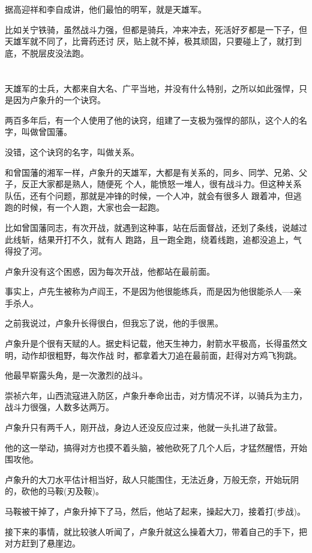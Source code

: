 \documentclass[11pt,a4paper,onecolumn]{article}
\begin{document}
据高迎祥和李自成讲，他们最怕的明军，就是天雄军。

比如关宁铁骑，虽然战斗力强，但都是骑兵，冲来冲去，死活好歹都是一下子，但天雄军就不同了，比膏药还讨
厌，贴上就不掉，极其顽固，只要碰上了，就打到底，不脱层皮没法跑。

\section[\thesection]{}

天雄军的士兵，大都来自大名、广平当地，并没有什么特别，之所以如此强悍，只是因为卢象升的一个诀窍。

两百多年后，有一个人使用了他的诀窍，组建了一支极为强悍的部队，这个人的名字，叫做曾国藩。

没错，这个诀窍的名字，叫做关系。

和曾国藩的湘军一样，卢象升的天雄军，大都是有关系的，同乡、同学、兄弟、父子，反正大家都是熟人，随便死
个人，能愤怒一堆人，很有战斗力。但这种关系队伍，还有个问题，那就是冲锋的时候，一个人冲，就会有很多人
跟着冲，但逃跑的时候，有一个人跑，大家也会一起跑。

比如曾国藩同志，有次开战，就遇到这种事，站在后面督战，还划了条线，说越过此线斩，结果开打不久，就有人
跑路，且一跑全跑，绕着线跑，追都没追上，气得投了河。

卢象升没有这个困惑，因为每次开战，他都站在最前面。

事实上，卢先生被称为卢阎王，不是因为他很能练兵，而是因为他很能杀人----亲手杀人。

之前我说过，卢象升长得很白，但我忘了说，他的手很黑。

卢象升是个很有天赋的人。据史料记载，他天生神力，射箭水平极高，长得虽然文明，动作却很粗野，每次作战
时，都拿着大刀追在最前面，赶得对方鸡飞狗跳。

他最早崭露头角，是一次激烈的战斗。

崇祯六年，山西流寇进入防区，卢象升奉命出击，对方情况不详，以骑兵为主力，战斗力很强，人数多达两万。

卢象升只有两千人，刚开战，身边人还没反应过来，他就一头扎进了敌营。

他的这一举动，搞得对方也摸不着头脑，被他砍死了几个人后，才猛然醒悟，开始围攻他。

卢象升的大刀水平估计相当好，敌人只能围住，无法近身，万般无奈，开始玩阴的，砍他的马鞍(刃及鞍)。

马鞍被干掉了，卢象升掉下了马，然后，他站了起来，操起大刀，接着打(步战)。

接下来的事情，就比较骇人听闻了，卢象升就这么操着大刀，带着自己的手下，把对方赶到了悬崖边。
\end{document}
